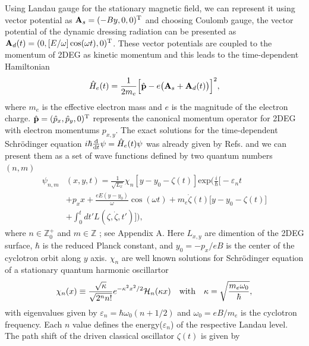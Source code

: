 Using Landau gauge for the stationary magnetic field, we can represent it using vector potential as $\vb{A}_{s} = (-By,0,0)^{\text{T}}$ and choosing Coulomb gauge, the vector potential of the dynamic dressing radiation can be presented as $\vb{A}_{d}(t) = (0,[E/\omega ]\cos(\omega t),0)^{\text{T}}$. These vector potentials are coupled to the momentum of 2DEG as kinetic momentum \cite{mahan00,bruus04} and this leads to the time-dependent Hamiltonian
\begin{equation} \label{eq_1}
  \hat{H}_e(t) = \frac{1}{2m_e}\Big[\hat{\vb{p}} - e\big(\vb{A}_{s}+\vb{A}_{d}(t)\big)\Big]^2,
\end{equation}
where $m_e$ is the effective electron mass and $e$ is the magnitude of the electron charge. $\hat{\vb{p}} = (\hat{p}_x,\hat{p}_y,0)^{\text{T}}$ represents the canonical momentum operator for 2DEG with electron momentums $p_{x,y}$.
The exact solutions for the time-dependent Schrödinger equation $i\hbar \dv{t}\psi = \hat{H}_e(t) \psi$ was already given by Refs. \cite{husmi53,ditt98,dini16} and we can present them as a set of wave functions defined by two quantum numbers $(n,m)$
\begin{equation} \label{eq_2}
  \begin{aligned}
    \psi_{n,m}&(x,y,t)  = \frac{1}{\sqrt{L_x}}
    \chi_n\left[y - y_0 - \zeta(t)\right]
    \text{exp}\bigg(
    \frac{i}{\hbar}\bigg[- \varepsilon_nt \\
    &
    + p_x x + \frac{eE(y - y_0)}{\omega}\cos(\omega t)+
    m_e\dot{\zeta}(t)\big[y - y_0 -\zeta(t)\big]\\
    & +
    \int_0^{t}dt'L(\zeta,\dot{\zeta},t')\bigg]\bigg),
  \end{aligned}
\end{equation}
where $n \in \mathbb{Z}^{+}_0$ and $m \in \mathbb{Z}$ ; see Appendix A. Here $L_{x,y}$ are dimention of the 2DEG surface, $\hbar$ is the reduced Planck constant, and $y_0 = -p_x/eB$ is the center of the cyclotron orbit along $y$ axis. $\chi_n$ are well known solutions for Schrödinger equation of a stationary quantum harmonic oscillartor
\begin{equation} \label{eq_3}
  \chi_n(x) \equiv
   \frac{\sqrt{\kappa}}{\sqrt{2^{n}n!}}
  e^{-\kappa^2 x^2/2}
  \mathcal{H}_n \qty(\kappa x) \quad \text{with}
  \quad
  \kappa = \sqrt{\frac{m_e \omega_0}{\hbar}},
\end{equation}
with eigenvalues given by $\varepsilon_n = \hbar \omega_0 (n + 1/2)$ and $\omega_0 = eB/m_e$ is the cyclotron frequency. Each $n$ value defines the  energy($\varepsilon_n$) of the respective Landau level. The path shift of the driven classical oscillator $\zeta(t)$ is given by
